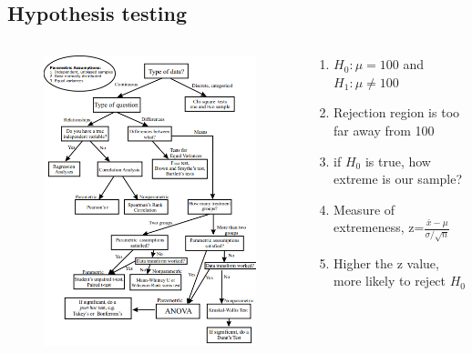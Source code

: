 \documentclass{beamer}
\begin{document}
\subsection{Hypothesis testing}
\begin{frame}[plain]
\begin{columns}
	\begin{column}{0.72\textwidth}
		\begin{figure}
			\includegraphics[scale=0.54]{statisticaltest}
		\end{figure}
	\end{column}
	\begin{column}{0.3\textwidth}
		\begin{enumerate}
			\item $H_0: \mu=100$ and $H_1: \mu \ne 100$
			\item Rejection region is too far away from 100
			\item if $H_0$ is true, how extreme is our sample?
			\item Measure of extremeness, z=$\frac{\bar{x}-\mu}{\sigma/\sqrt{n}}$
			\item Higher the z value, more likely to reject $H_0$
		\end{enumerate}
	\end{column}
\end{columns}
\end{frame}
\end{document}
